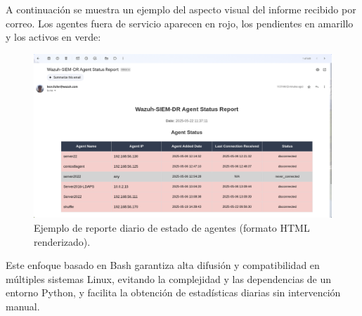 A continuación se muestra un ejemplo del aspecto visual del informe recibido por correo. Los agentes fuera de servicio aparecen en rojo, los pendientes en amarillo y los activos en verde:

\begin{figure}[H]
  \centering
  \includegraphics[width=1.0\textwidth]{figures/wazuh_agent_report_example.png}
  \caption{Ejemplo de reporte diario de estado de agentes (formato HTML renderizado).}
  \label{fig:agent_report}
\end{figure}

Este enfoque basado en Bash garantiza alta difusión y compatibilidad en múltiples sistemas Linux, evitando la complejidad y las dependencias de un entorno Python, y facilita la obtención de estadísticas diarias sin intervención manual.  